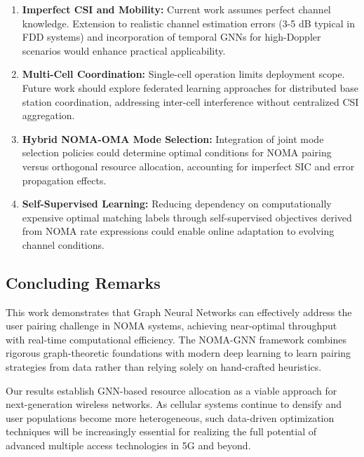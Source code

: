 \begin{enumerate}
    \item \textbf{Imperfect CSI and Mobility:} Current work assumes perfect channel knowledge. Extension to realistic channel estimation errors (3-5 dB typical in FDD systems) and incorporation of temporal GNNs for high-Doppler scenarios would enhance practical applicability.
    
    \item \textbf{Multi-Cell Coordination:} Single-cell operation limits deployment scope. Future work should explore federated learning approaches for distributed base station coordination, addressing inter-cell interference without centralized CSI aggregation.
    
    \item \textbf{Hybrid NOMA-OMA Mode Selection:} Integration of joint mode selection policies could determine optimal conditions for NOMA pairing versus orthogonal resource allocation, accounting for imperfect SIC and error propagation effects.
    
    \item \textbf{Self-Supervised Learning:} Reducing dependency on computationally expensive optimal matching labels through self-supervised objectives derived from NOMA rate expressions could enable online adaptation to evolving channel conditions.
\end{enumerate}

\subsection{Concluding Remarks}

This work demonstrates that Graph Neural Networks can effectively address the user pairing challenge in NOMA systems, achieving near-optimal throughput with real-time computational efficiency. The NOMA-GNN framework combines rigorous graph-theoretic foundations with modern deep learning to learn pairing strategies from data rather than relying solely on hand-crafted heuristics.

Our results establish GNN-based resource allocation as a viable approach for next-generation wireless networks. As cellular systems continue to densify and user populations become more heterogeneous, such data-driven optimization techniques will be increasingly essential for realizing the full potential of advanced multiple access technologies in 5G and beyond.

